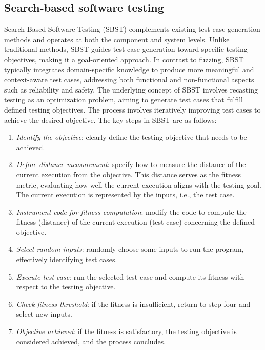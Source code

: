 \subsection{Search-based software testing}
Search-Based Software Testing (SBST) complements existing test case generation methods and operates at both the component and system levels.
Unlike traditional methods, SBST guides test case generation toward specific testing objectives, making it a goal-oriented approach.
In contrast to fuzzing, SBST typically integrates domain-specific knowledge to produce more meaningful and context-aware test cases, addressing both functional and non-functional aspects such as reliability and safety.
The underlying concept of SBST involves recasting testing as an optimization problem, aiming to generate test cases that fulfill defined testing objectives. 
The process involves iteratively improving test cases to achieve the desired objective. 
The key steps in SBST are as follows:
\begin{enumerate}
    \item \textit{Identify the objective}: clearly define the testing objective that needs to be achieved.
    \item \textit{Define distance measurement}: specify how to measure the distance of the current execution from the objective. 
        This distance serves as the fitness metric, evaluating how well the current execution aligns with the testing goal. 
        The current execution is represented by the inputs, i.e., the test case.
    \item \textit{Instrument code for fitness computation}: modify the code to compute the fitness (distance) of the current execution (test case) concerning the defined objective.
    \item \textit{Select random inputs}: randomly choose some inputs to run the program, effectively identifying test cases.
    \item \textit{Execute test case}: run the selected test case and compute its fitness with respect to the testing objective.
    \item \textit{Check fitness threshold}: if the fitness is insufficient, return to step four and select new inputs.
    \item \textit{Objective achieved}: if the fitness is satisfactory, the testing objective is considered achieved, and the process concludes.
\end{enumerate}